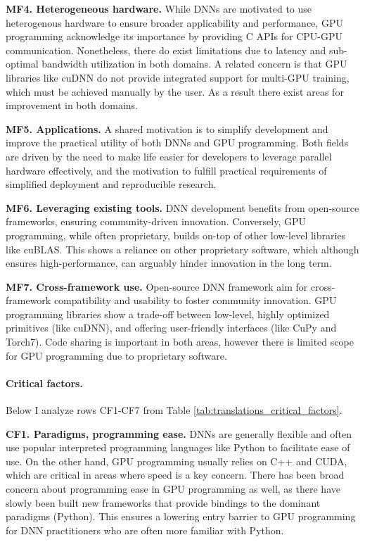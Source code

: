 \textbf{MF4. Heterogeneous hardware.}
While DNNs are motivated to use heterogenous hardware to ensure broader applicability and performance, GPU programming
acknowledge its importance by providing C APIs for CPU-GPU communication. Nonetheless, there do exist limitations
due to latency and sub-optimal bandwidth utilization in both domains. A related concern is that GPU libraries like cuDNN do not provide
integrated support for multi-GPU training, which must be achieved manually by the user. As a result there exist areas
for improvement in both domains.

\textbf{MF5. Applications.}
A shared motivation is to simplify development and improve the practical utility of both DNNs and GPU programming.
Both fields are driven by the need to make life easier for developers to leverage parallel hardware effectively,
and the motivation to fulfill practical requirements of simplified deployment and reproducible research.

\textbf{MF6. Leveraging existing tools.}
DNN development benefits from open-source frameworks, ensuring community-driven innovation. Conversely, GPU programming,
while often proprietary, builds on-top of other low-level libraries like cuBLAS. This shows a reliance on other
proprietary software, which although ensures high-performance, can arguably hinder innovation in the long term.

\textbf{MF7. Cross-framework use.}
Open-source DNN framework aim for cross-framework compatibility and usability to foster community innovation.
GPU programming libraries show a trade-off between low-level, highly optimized primitives (like cuDNN), and offering
user-friendly interfaces (like CuPy and Torch7). Code sharing is important in both areas, however there is limited
scope for GPU programming due to proprietary software.

\paragraph{Critical factors.}
Below I analyze rows CF1-CF7 from Table \ref{tab:translations_critical_factors}.

\textbf{CF1. Paradigms, programming ease.}
DNNs are generally flexible and often use popular interpreted programming languages like Python to facilitate
ease of use.
On the other hand, GPU programming usually relies on C++ and CUDA, which are critical in areas
where speed is a key concern. There has been broad concern about programming ease in GPU programming
as well, as there have slowly been built new frameworks that provide bindings to the dominant paradigms
(Python). This ensures a lowering entry barrier to GPU programming for DNN practitioners who are
often more familiar with Python.

